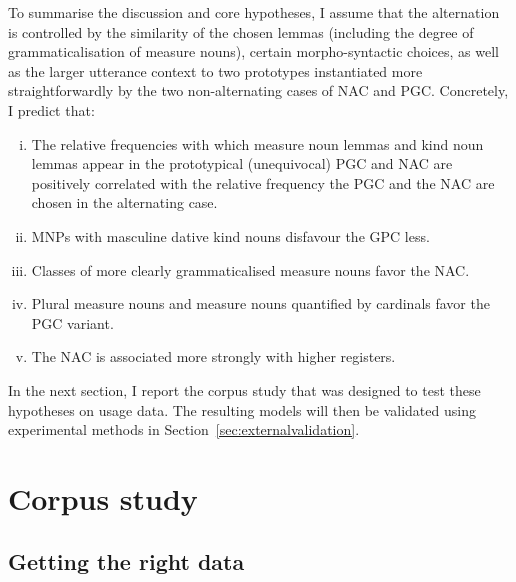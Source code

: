 \documentclass[USenglish]{article}
\begin{document}
To summarise the discussion and core hypotheses, I assume that the alternation is controlled by the similarity of the chosen lemmas (including the degree of grammaticalisation of measure nouns), certain morpho-syntactic choices, as well as the larger utterance context to two prototypes instantiated more straightforwardly by the two non-alternating cases of NAC and PGC.
Concretely, I predict that:

\begin{enumerate}[i.]
  \item The relative frequencies with which measure noun lemmas and kind noun lemmas appear in the prototypical (unequivocal) PGC and NAC are positively correlated with the relative frequency the PGC and the NAC are chosen in the alternating case.
  \item MNPs with masculine dative kind nouns disfavour the GPC less.
  \item Classes of more clearly grammaticalised measure nouns favor the NAC.
  \item Plural measure nouns and measure nouns quantified by cardinals favor the PGC variant.
  \item The NAC is associated more strongly with higher registers.
\end{enumerate}

\vspace{-1\baselineskip}

In the next section, I report the corpus study that was designed to test these hypotheses on usage data.
The resulting models will then be validated using experimental methods in Section~\ref{sec:externalvalidation}.





\section{Corpus study}
\label{sec:corpusstudies}


\subsection{Getting the right data}
\label{sec:gettingdata}

\end{document}

